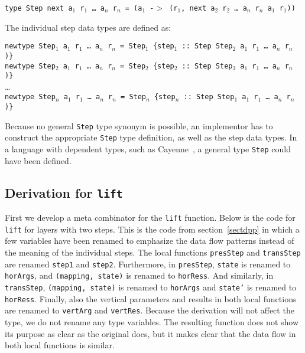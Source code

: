 \begin{tabbing}
{\tt type St}\={\tt ep next a$_1$ r$_1$ \dots ~a$_n$ r$_n$ = (a$_1$ -$>$  (r$_1$, next a$_2$ r$_2$ \dots ~a$_n$ r$_n$ a$_1$ r$_1$)) }
\end{tabbing}

The individual step data types are defined as:

{\tt newtype Step$_1$ a$_1$ r$_1$ \dots ~a$_n$ r$_n$ = Step$_1$ \{step$_1$}\verb| :: |{\tt Step Step$_2$ a$_1$ r$_1$ \dots ~a$_n$ r$_n$ )\}}\\
{\tt newtype Step$_2$ a$_1$ r$_1$ \dots ~a$_n$ r$_n$ = Step$_2$ \{step$_2$}\verb| :: |{\tt Step Step$_3$ a$_1$ r$_1$ \dots ~a$_n$ r$_n$ )\}}\\
\dots\\
{\tt newtype Step$_n$ a$_1$ r$_1$ \dots ~a$_n$ r$_n$ = Step$_n$ \{step$_n$}\verb| :: |{\tt Step Step$_1$ a$_1$ r$_1$ \dots ~a$_n$ r$_n$ )\}}

Because no general \texttt{Step} type synonym is possible, an implementor has to construct the appropriate \texttt{Step} type definition, as well as the step data types. In a language with dependent types, such as Cayenne~\cite{cayenne}, a general type \texttt{Step} could have been defined.


%																
\subsection{Derivation for \texttt{lift}}

First we develop a meta combinator for the \texttt{lift} function. Below is the code for \texttt{lift} for layers with two steps. This is the code from section~\ref{sectdpp} in which a few variables have been renamed to emphasize the data flow patterns instead of the meaning of the individual steps. The local functions \texttt{presStep} and \texttt{transStep} are renamed \texttt{step1} and \texttt{step2}. Furthermore, in \texttt{presStep}, \texttt{state} is renamed to \texttt{horArgs}, and \texttt{(mapping, state)} is renamed to \texttt{horRess}. And similarly, in \texttt{transStep}, \texttt{(mapping, state)} is renamed to \texttt{horArgs} and \texttt{state'} is renamed to \texttt{horRess}. Finally, also the vertical parameters and results in both local functions are renamed to \texttt{vertArg} and \texttt{vertRes}. Because the derivation will not affect the type, we do not rename any type variables. The resulting function does not show its purpose as clear as the original does, but it makes clear that the data flow in both local functions is similar.

